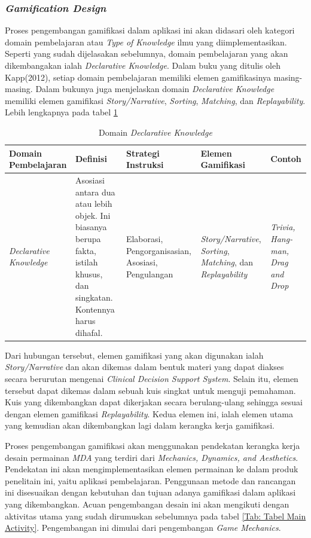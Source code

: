 \subsubsection{\textit{Gamification Design}}
Proses pengembangan gamifikasi dalam aplikasi ini akan didasari oleh kategori domain pembelajaran atau \textit{Type of Knowledge} ilmu yang diimplementasikan. Seperti yang sudah dijelasakan sebelumnya, domain pembelajaran yang akan dikembangakan ialah \textit{Declarative Knowledge}.
Dalam buku yang ditulis oleh Kapp(2012), setiap domain pembelajaran memiliki elemen gamifikasinya masing-masing. Dalam bukunya juga menjelaskan domain \textit{Declarative Knowledge} memiliki elemen gamifikasi \textit{Story/Narrative}, \textit{Sorting}, \textit{Matching}, dan \textit{Replayability}.
Lebih lengkapnya pada tabel \ref*{Tab:Declarative-knowledge}
\begin{table}[H]
	\centering
	\caption{Domain \textit{Declarative Knowledge}}
	\begin{tabular}{|p{2.7cm}|p{3cm}|p{2.7cm}|p{2.7cm}|p{2cm}|}
		\hline
		\centering\textbf{Domain Pembelajaran} &\centering\textbf{Definisi}  &\centering\textbf{Strategi Instruksi}  &\centering\textbf{Elemen Gamifikasi} &\multicolumn{1}{m{2cm}|}{\centering \textbf{Contoh}}\\
		\hline
		\textit{Declarative Knowledge} 
		&Asosiasi antara dua atau lebih objek. Ini biasanya berupa fakta, istilah khusus, dan singkatan. Kontennya harus dihafal.
		&Elaborasi, Pengorganisasian, Asosiasi, Pengulangan
		&\textit{Story/Narrative}, \textit{Sorting}, \textit{Matching}, dan \textit{Replayability}
		&\textit{Trivia, Hang-man, Drag and Drop} \\
		\hline
	\end{tabular}
	\label{Tab:Declarative-knowledge}
\end{table}
Dari hubungan tersebut, elemen gamifikasi yang akan digunakan ialah \textit{Story/Narrative} dan akan dikemas dalam bentuk materi yang dapat diakses secara berurutan mengenai \textit{Clinical Decision Support System}. Selain itu, elemen tersebut dapat dikemas dalam sebuah kuis singkat untuk menguji pemahaman.
Kuis yang dikembangkan dapat dikerjakan secara berulang-ulang sehingga sesuai dengan elemen gamifikasi \textit{Replayability}. Kedua elemen ini, ialah elemen utama yang kemudian akan dikembangkan lagi dalam kerangka kerja gamifikasi.

Proses pengembangan gamifikasi akan menggunakan pendekatan kerangka kerja desain permainan \textit{MDA} yang terdiri dari \textit{Mechanics, Dynamics, and Aesthetics}. 
Pendekatan ini akan mengimplementasikan elemen permainan ke dalam produk penelitain ini, yaitu aplikasi pembelajaran.
Penggunaan metode dan rancangan ini disesuaikan dengan kebutuhan dan tujuan adanya gamifikasi dalam aplikasi yang dikembangkan.
Acuan pengembangan desain ini akan mengikuti dengan aktivitas utama yang sudah dirumuskan sebelumnya pada tabel \ref*{Tab: Tabel Main Activity}.
Pengembangan ini dimulai dari pengembangan \textit{Game Mechanics}.

